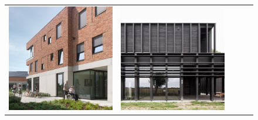 \begin{figure}[H]
{\begin{tabular}{@{}ccccc@{}}
      \includegraphics[width=\linewidth]{Images/LoRAs/Plintwerking/Training_images/6.jpg} &
      \includegraphics[width=\linewidth]{Images/LoRAs/Plintwerking/Training_images/7.jpeg} &

\end{tabular}}
\end{figure}
